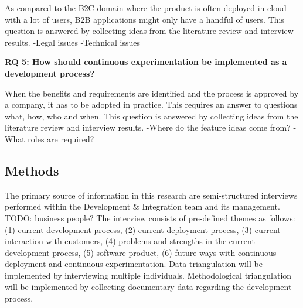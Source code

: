 \documentclass[english]{tktltiki2}
\theoremstyle{definition}
\theoremstyle{remark}
\begin{document}
\noindent As compared to the B2C domain where the product is often deployed in cloud with a lot of users, B2B applications might only have a handful of users. This question is answered by collecting ideas from the literature review and interview results. \newline
-Legal issues
-Technical issues

\noindent \textbf{RQ 5: How should continuous experimentation be implemented as a development process?}

\noindent When the benefits and requirements are identified and the process is approved by a company, it has to be adopted in practice. This requires an answer to questions what, how, who and when. This question is answered by collecting ideas from the literature review and interview results. \newline
-Where do the feature ideas come from?
-What roles are required?

\subsection{Methods} %
The primary source of information in this research are semi-structured interviews performed within the Development & Integration team and its management. TODO: business people? The interview consists of pre-defined themes as follows: (1) current development process, (2) current deployment process, (3) current interaction with customers, (4) problems and strengths in the current development process, (5) software product, (6) future ways with continuous deployment and continuous experimentation. Data triangulation will be implemented by interviewing multiple individuals. Methodological triangulation will be implemented by collecting documentary data regarding the development process.
\end{document}
